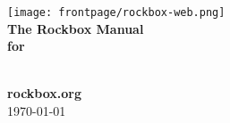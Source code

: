 \thispagestyle{empty}
\vspace*{0.3cm}
\begin{center}
{\texttt{[image: frontpage/rockbox-web.png]}}\\
\vspace{2cm}
\huge{\textsf{\textbf{The Rockbox Manual\\for\\\playername}}}\vspace{1cm}\\

\vspace{\fill}

\large \textsf{\textbf{rockbox.org}\\\today}


\end{center}

\pagebreak
\thispagestyle{empty}
\cleardoublepage
